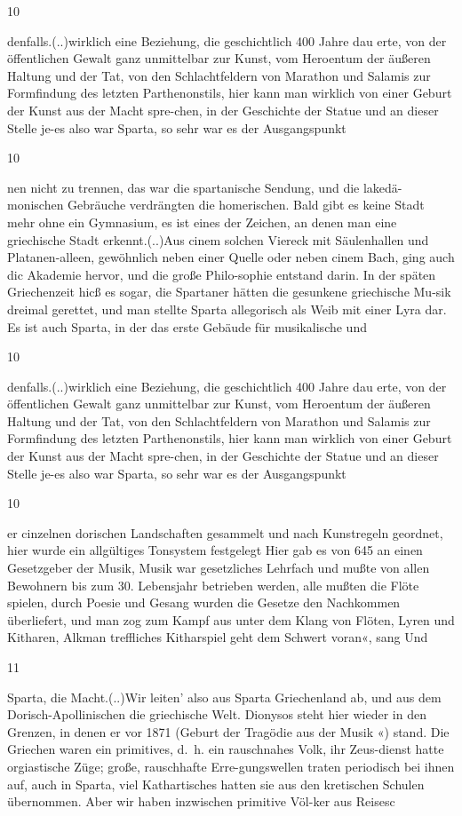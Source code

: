 \documentclass[
  letterpaper,
  DIV=11,
  numbers=noendperiod]{scrartcl}
\begin{document}
10

denfalls.(..)wirklich eine Beziehung, die geschichtlich 400 Jahre dau
erte, von der öffentlichen Gewalt ganz unmittelbar zur Kunst, vom
Heroentum der äußeren Haltung und der Tat, von den Schlachtfeldern von
Marathon und Salamis zur Formfindung des letzten Parthenonstils, hier
kann man wirklich von einer Geburt der Kunst aus der Macht spre-chen, in
der Geschichte der Statue und an dieser Stelle je-es also war Sparta, so
sehr war es der Ausgangspunkt

10

nen nicht zu trennen, das war die spartanische Sendung, und die
lakedä-monischen Gebräuche verdrängten die homerischen. Bald gibt es
keine Stadt mehr ohne ein Gymnasium, es ist eines der Zeichen, an denen
man eine griechische Stadt erkennt.(..)Aus cinem solchen Viereck mit
Säulenhallen und Platanen-alleen, gewöhnlich neben einer Quelle oder
neben cinem Bach, ging auch dic Akademie hervor, und die große
Philo-sophie entstand darin. In der späten Griechenzeit hicß es sogar,
die Spartaner hätten die gesunkene griechische Mu-sik dreimal gerettet,
und man stellte Sparta allegorisch als Weib mit einer Lyra dar. Es ist
auch Sparta, in der das erste Gebäude für musikalische und

10

denfalls.(..)wirklich eine Beziehung, die geschichtlich 400 Jahre dau
erte, von der öffentlichen Gewalt ganz unmittelbar zur Kunst, vom
Heroentum der äußeren Haltung und der Tat, von den Schlachtfeldern von
Marathon und Salamis zur Formfindung des letzten Parthenonstils, hier
kann man wirklich von einer Geburt der Kunst aus der Macht spre-chen, in
der Geschichte der Statue und an dieser Stelle je-es also war Sparta, so
sehr war es der Ausgangspunkt

10

er cinzelnen dorischen Landschaften gesammelt und nach Kunstregeln
geordnet, hier wurde ein allgültiges Tonsystem festgelegt Hier gab es
von 645 an einen Gesetzgeber der Musik, Musik war gesetzliches Lehrfach
und mußte von allen Bewohnern bis zum 30. Lebensjahr betrieben werden,
alle mußten die Flöte spielen, durch Poesie und Gesang wurden die
Gesetze den Nachkommen überliefert, und man zog zum Kampf aus unter dem
Klang von Flöten, Lyren und Kitharen, Alkman treffliches Kitharspiel
geht dem Schwert voran«, sang Und

11

Sparta, die Macht.(..)Wir leiten' also aus Sparta Griechenland ab, und
aus dem Dorisch-Apollinischen die griechische Welt. Dionysos steht hier
wieder in den Grenzen, in denen er vor 1871 (Geburt der Tragödie aus der
Musik «) stand. Die Griechen waren ein primitives, d.~h. ein rauschnahes
Volk, ihr Zeus-dienst hatte orgiastische Züge; große, rauschhafte
Erre-gungswellen traten periodisch bei ihnen auf, auch in Sparta, viel
Kathartisches hatten sie aus den kretischen Schulen übernommen. Aber wir
haben inzwischen primitive Völ-ker aus Reisesc
\end{document}
